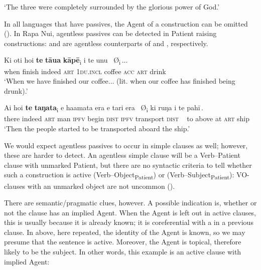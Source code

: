 \glt 
‘The three were completely surrounded by the glorious power of God.’ \textstyleExampleref{[Luke 9:31]}
\z

In all languages that have passives, the Agent of a  construction can be omitted (\citealt[329]{KeenanDryer2007}). In Rapa Nui, agentless passives can be detected in Patient raising constructions:  and  are agentless counterparts of  and , respectively.

\ea\label{ex:8.55}
\gll Ki oti ho{\ꞌ}i \textbf{te} \textbf{tāua} \textbf{kāpē}\textsubscript{\textup{i}} {\ob}i te unu ~\textup{Ø}\textsubscript{\textup{i}}\,{\cb}...\\
when finish indeed \textsc{art} \textsc{1du.incl} coffee {\db}\textsc{acc} \textsc{art} drink \\

\glt 
‘When we have finished our coffee... (lit. when our coffee has finished being drunk).’ \textstyleExampleref{[R301.043]} 
\z

\ea\label{ex:8.56}
\gll {\ꞌ}Ai ho{\ꞌ}i \textbf{te} \textbf{taŋata}\textsubscript{\textup{i}} e ha{\ꞌ}amata era {\ob}e tari era ~\textup{Ø\textsubscript{i}} ki ruŋa i te pahī\,{\cb}.\\
there indeed \textsc{art} man \textsc{ipfv} begin \textsc{dist} {\db}\textsc{ipfv} transport \textsc{dist} ~ to above at \textsc{art} ship\\

\glt
‘Then the people started to be transported aboard the ship.’ \textstyleExampleref{[R210.040]} 
\z

We would expect agentless passives to occur in simple clauses as well; however, these are harder to detect. An agentless simple  clause will be a Verb–Patient clause with unmarked Patient, but there are no syntactic criteria to tell whether such a construction is active (Verb–Object\textsubscript{Patient}) or  (Verb–Subject\textsubscript{Patient}): VO-clauses with an unmarked object are not uncommon ().

There are semantic/pragmatic clues, however. A possible indication is, whether or not the clause has an implied Agent. When the Agent is left out in active clauses, this is usually because it is already known; it is coreferential with a  in a previous clause. In  above, here repeated, the identity of the Agent is known, so we may presume that the sentence is active. Moreover, the Agent is topical, therefore likely to be the subject. In other words, this example is an active clause with implied Agent:

